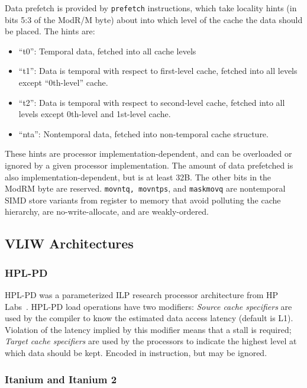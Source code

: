 Data prefetch is provided by \verb=prefetch= instructions, which take locality hints (in bits 5:3 of the ModR/M byte) about into which level of the cache the data should be placed. The hints are:
\begin{itemize}
\item ``t0'': Temporal data, fetched into all cache levels
\item ``t1'': Data is temporal with respect to first-level cache, fetched into all levels except ``0th-level'' cache.
\item ``t2'': Data is temporal with respect to second-level cache, fetched into all levels except 0th-level and 1st-level cache.
\item ``nta'': Nontemporal data, fetched into non-temporal cache structure.
\end{itemize}

These hints are processor implementation-dependent, and can be overloaded or ignored by a given processor implementation. The amount of data prefetched is also implementation-dependent, but is at least 32B. The other bits in the ModRM byte are reserved. 
\verb=movntq, movntps=, and \verb=maskmovq= are nontemporal SIMD store variants from register to memory that avoid polluting the cache hierarchy, are no-write-allocate, and are weakly-ordered.

\subsection{VLIW Architectures}
\subsubsection{HPL-PD} 

HPL-PD was a parameterized ILP research processor architecture from HP Labs~\cite{kathail2000hpl}.
HPL-PD load operations have two modifiers:
{\em Source cache specifiers} are used by the compiler to know the estimated data access latency (default is L1). Violation of the latency implied by this modifier means that a stall is required;
{\em Target cache specifiers} are used by the processors to indicate the highest level at which data should be kept. Encoded in instruction, but may be ignored.

\subsubsection{Itanium and Itanium 2}

